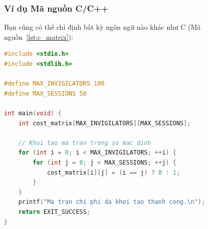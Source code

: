 \subsubsection{Ví dụ Mã nguồn C/C++}
Bạn cũng có thể chỉ định bất kỳ ngôn ngữ nào khác như C (Mã nguồn~\ref{lst:c_matrix}):

\begin{lstlisting}[language=C, caption={Khởi tạo ma trận chi phí trong ngôn ngữ C}, label={lst:c_matrix}]
#include <stdio.h>
#include <stdlib.h>

#define MAX_INVIGILATORS 100
#define MAX_SESSIONS 50

int main(void) {
    int cost_matrix[MAX_INVIGILATORS][MAX_SESSIONS];
    
    // Khoi tao ma tran trong so mac dinh
    for (int i = 0; i < MAX_INVIGILATORS; ++i) {
        for (int j = 0; j < MAX_SESSIONS; ++j) {
            cost_matrix[i][j] = (i == j) ? 0 : 1;
        }
    }
    printf("Ma tran chi phi da khoi tao thanh cong.\n");
    return EXIT_SUCCESS;
}
\end{lstlisting}
